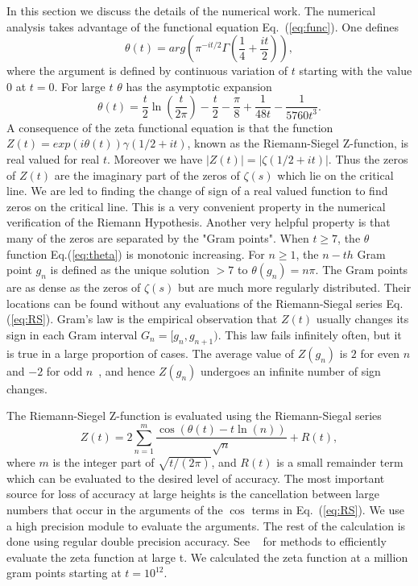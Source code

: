 \documentclass[twoside]{article}
\begin{document}
In this section we discuss the details of the numerical work. 
The numerical analysis takes advantage of the functional 
equation Eq.~(\ref{eq:func}).
One defines
\begin{equation}
\theta(t) = arg (\pi^{−it/2} \Gamma(\frac{1}{4} + \frac{it}{2})), 
\label{eq:theta}
\end{equation}
where the argument is defined by continuous variation of $t$ starting with the value $0$ at $t = 0$.
For large $t$ $\theta$ has the asymptotic expansion
\begin{equation}
\theta(t) = \frac{t}{2}\ln (\frac{t}{2\pi}) - \frac{t}{2} - \frac{\pi}{8} + \frac{1}{48t} - \frac{1}{5760t^3}. 
\label{eq:thetaAsymptotic}
\end{equation}
A consequence of the zeta functional equation is that the function 
$Z(t)=exp(i\theta(t))\gamma(1/2 +it)$,
known as the Riemann-Siegel Z-function, is real valued for real $t$. 
Moreover we have $|Z(t)| = |\zeta(1/2+it)|$. Thus the zeros of $Z(t)$ are the imaginary part of the zeros 
of $\zeta(s)$ which lie on the critical line. We are led to finding the change of sign 
of a real valued function 
to find zeros on the critical line. This is a very convenient property in the numerical verification 
of the Riemann Hypothesis.
Another very helpful property is that many of the zeros are separated by the
"Gram points".  When $t \ge 7$, the $\theta$ function Eq.(\ref{eq:theta}) is monotonic increasing. 
For $n \ge 1$, the $n-th$ Gram point $g_n$ is defined as the unique solution $> 7$ to
$\theta (g_n) = n\pi$.
The Gram points are as dense as the zeros of $\zeta(s)$ but are much more regularly distributed.
Their locations can be found without any evaluations of the Riemann-Siegal series Eq.(\ref{eq:RS}).
Gram's law is the empirical observation that $Z(t)$ usually changes its sign in each Gram interval 
$G_n = [g_n,g_{n+1})$. 
This law fails infinitely often, but it is true in a large proportion of cases.
The average value of $Z(g_n)$ is $2$ for even $n$ and $-2$ for odd $n$~\cite{Titchmarsh(1986)},
and hence $Z(g_n)$ undergoes an infinite number of sign changes.


The Riemann-Siegel Z-function is evaluated using the Riemann-Siegal series
\begin{equation}
Z(t) = 2\sum^{m}_{n=1}\frac{\cos(\theta(t) - t \ln (n))}{\sqrt{n}} + R(t), 
\label{eq:RS}
\end{equation}
where $m$ is the integer part of $\sqrt{t/(2\pi)}$, and $R(t)$ is a small remainder
term which can be evaluated to the desired level of accuracy. The most important 
source for loss of accuracy at large heights is the cancellation between
large numbers that occur in the arguments of the $\cos$ terms in Eq.~(\ref{eq:RS}). We 
use a high precision module to evaluate the arguments. The rest of the calculation
is done using regular double precision accuracy. See ~\cite{hiary,gourdon,Odlyzko(1989)} for methods to efficiently evaluate the zeta function at large t.
We calculated the zeta function at a million gram points starting at $t = 10^{12}$.
\end{document}
